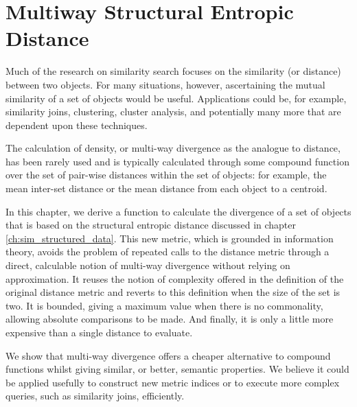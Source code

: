 \chapter{Multiway Structural Entropic Distance}\label{ch:msed}
%
Much of the research on similarity search focuses on the similarity (or distance) between two objects.  For many situations, however, ascertaining the mutual similarity of a set of objects would be useful. Applications could be, for example, similarity joins, clustering, cluster analysis, and potentially many more that are dependent upon these techniques.

The calculation of density, or multi-way divergence as the analogue to distance, has been rarely used and is typically calculated through some compound function over the set of pair-wise distances within the set of objects: for example, the mean inter-set distance or the mean distance from each object to a centroid.  

In this chapter, we derive a function to calculate the divergence of a set of objects that is based on the structural entropic distance discussed in chapter \ref{ch:sim_structured_data}.  This new metric, which is grounded in information theory, avoids the problem of repeated calls to the distance metric through a direct, calculable notion of multi-way divergence without relying on approximation.  It reuses the notion of complexity offered in the definition of the original distance metric and reverts to this definition when the size of the set is two.  It is bounded, giving a maximum value when there is no commonality, allowing absolute comparisons to be made.  And finally, it is only a little more expensive than a single distance to evaluate.

We show that multi-way divergence offers a cheaper alternative to compound functions whilst giving similar, or better, semantic properties.  We believe it could be applied usefully to construct new metric indices or to execute more complex queries, such as similarity joins, efficiently. 
